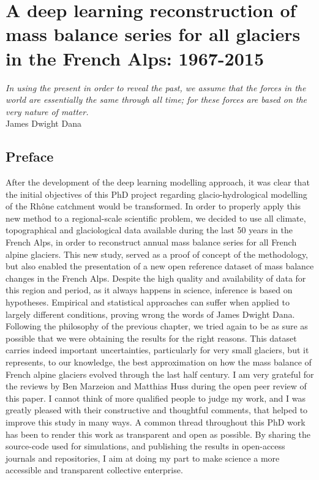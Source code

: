 \chapter{A deep learning reconstruction of mass balance series for all glaciers in the French Alps: 1967-2015}
\label{chap:past}

\begin{flushright}
{\small \textit{In using the present in order to reveal the past, we assume that the forces in the world are essentially the same through all time; for these forces are based on the very nature of matter.}\\
James Dwight Dana}
\end{flushright}

\section*{Preface}

After the development of the deep learning modelling approach, it was clear that the initial objectives of this PhD project regarding glacio-hydrological modelling of the Rhône catchment would be transformed. In order to properly apply this new method to a regional-scale scientific problem, we decided to use all climate, topographical and glaciological data available during the last 50 years in the French Alps, in order to reconstruct annual mass balance series for all French alpine glaciers. This new study, served as a proof of concept of the methodology, but also enabled the presentation of a new open reference dataset of mass balance changes in the French Alps. Despite the high quality and availability of data for this region and period, as it always happens in science, inference is based on hypotheses. Empirical and statistical approaches can suffer when applied to largely different conditions, proving wrong the words of James Dwight Dana. Following the philosophy of the previous chapter, we tried again to be as sure as possible that we were obtaining the results for the right reasons. This dataset carries indeed important uncertainties, particularly for very small glaciers, but it represents, to our knowledge, the best approximation on how the mass balance of French alpine glaciers evolved through the last half century. I am very grateful for the reviews by Ben Marzeion and Matthias Huss during the open peer review of this paper. I cannot think of more qualified people to judge my work, and I was greatly pleased with their constructive and thoughtful comments, that helped to improve this study in many ways. A common thread throughout this PhD work has been to render this work as transparent and open as possible. By sharing the source-code used for simulations, and publishing the results in open-access journals and repositories, I aim at doing my part to make science a more accessible and transparent collective enterprise. 


